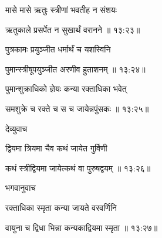 {\devanagarifont मासे मासे ऋतुः स्त्रीणां भवतीह न संशयः \thinspace{\dandab} \dontdisplaylinenum }%


{\devanagarifont ऋतुकाले प्रसर्पेत न सुखार्थं वरानने {॥ १३:२३॥} \veg\dontdisplaylinenum }%

{\devanagarifont पुत्रकामः प्रयुञ्जीत धर्मार्थं च यशस्विनि \thinspace{\dandab} \dontdisplaylinenum }%


{\devanagarifont पुमान्स्त्रीषूपयुञ्जीत अरणीव हुताशनम् {॥ १३:२४॥} \veg\dontdisplaylinenum }%

{\devanagarifont पुमान्शुक्राधिको ज्ञेयः कन्या रक्ताधिका भवेत् \thinspace{\dandab} \dontdisplaylinenum }%
 

{\devanagarifont समशुक्रे च रक्ते च स च जायेन्नपुंसकः {॥ १३:२५॥} \veg\dontdisplaylinenum }%
 

{\devanagarifont देव्युवाच {\dandab}\dontdisplaylinenum  }%
 
{\devanagarifont द्वियमा त्रियमा चैव कथं जायेत गुर्विणी \thinspace{\danda} \dontdisplaylinenum }%
 

{\devanagarifont कथं स्त्रीद्वियमा जायेत्कथं वा पुरुषद्वयम् {॥ १३:२६॥} \veg\dontdisplaylinenum }%
 
{\devanagarifont भगवानुवाच {\dandab}\dontdisplaylinenum  }%
 
{\devanagarifont रक्ताधिका स्मृता कन्या जायते वरवर्णिनि \thinspace{\danda} \dontdisplaylinenum }%
 

{\devanagarifont वायुना च द्विधा भिन्ना कन्यकाद्वियमा स्मृता {॥ १३:२७॥} \veg\dontdisplaylinenum }%

